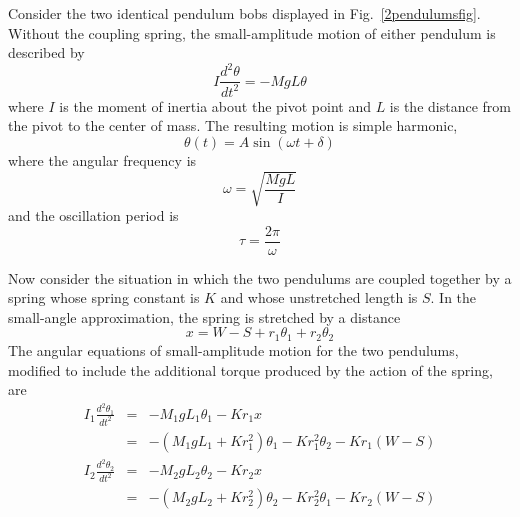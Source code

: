 \documentclass{revtex4}
\begin{document}
Consider the two identical pendulum bobs displayed in
Fig.~\ref{2pendulumsfig}. Without the coupling spring,
the small-amplitude motion of either pendulum is described by
\begin{equation}
I\frac{d^2\theta}{dt^2} = -MgL\theta
\end{equation}
where $I$ is the moment of inertia about the pivot point and $L$ is the
distance from the pivot to the center of mass. The resulting motion is
simple harmonic,
\begin{equation}
\theta(t) = A \sin(\omega t + \delta)
\end{equation}
where the angular frequency is
\begin{equation}
\omega = \sqrt{\frac{MgL}{I}} \label{eq:omegadef}
\end{equation}
and the oscillation period is
\begin{equation}
\tau = \frac{2\pi}{\omega} \label{eq:omega2tau}
\end{equation}

Now consider the situation in which the two pendulums are coupled together
by a spring whose spring constant is $K$ and whose unstretched length is
$S$.  In the small-angle approximation, the spring is stretched by a
distance
\begin{equation}
x = W-S+r_1\theta_1+r_2\theta_2
\end{equation}
The angular equations of small-amplitude motion for the two pendulums,
modified to include the additional torque produced by the action of the
spring, are
\begin{eqnarray}
I_1\frac{d^2\theta_1}{dt^2} &=& -M_1gL_1\theta_1 - Kr_1x \nonumber \\
    &=& -(M_1gL_1+Kr_1^2)\theta_1 - Kr_1^2\theta_2 - Kr_1(W-S)
    \label{eq:eom1}\\
I_2\frac{d^2\theta_2}{dt^2} &=& -M_2gL_2\theta_2 - Kr_2x \nonumber \\
    &=& -(M_2gL_2+Kr_2^2)\theta_2 - Kr_2^2\theta_1 - Kr_2(W-S)
    \label{eq:eom2}
\end{eqnarray}
\end{document}
